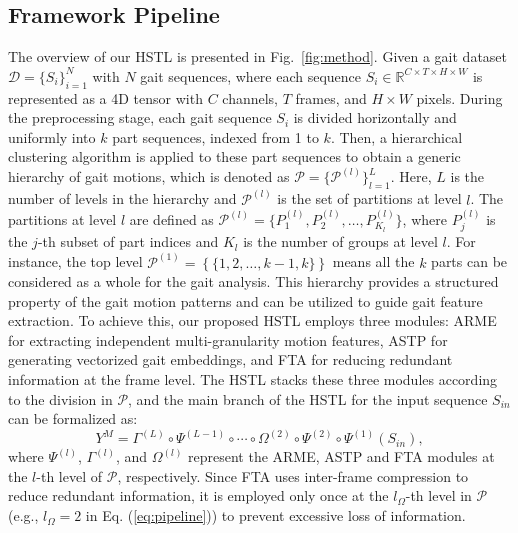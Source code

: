 \documentclass[10pt,twocolumn,letterpaper]{article}
\begin{document}
\subsection{Framework Pipeline}
\label{sec:pipe}
The overview of our HSTL is presented in Fig.~\ref{fig:method}. Given a gait dataset $\mathcal{D}=\{{S_i}\}_{i=1}^{N} $ with $N$ gait sequences, where each sequence $S_i \in \mathbb{R}^{C \times T \times H \times W}$ is represented as a 4D tensor with $C$ channels, $T$ frames, and $H \times W$ pixels. During  the preprocessing stage, each gait sequence $S_i$  is divided horizontally and uniformly into $k$ part sequences, indexed from 1 to $k$. Then, a hierarchical clustering algorithm \cite{ester1996density} is applied to these part sequences to obtain a generic hierarchy of gait motions, which is denoted as $\mathcal{P}=\{\mathcal{P}^{(l)}\}_{l=1}^{L}$. Here, $L$ is the number of levels in the hierarchy and $\mathcal{P}^{(l)}$ is the set of partitions at level $l$. The partitions at level $l$ are defined as
 $\mathcal{P}^{(l)}=\{P_1^{(l)}, P_2^{(l)}, \ldots, P_{K_{l}}^{(l)}\}$, where $P_j^{(l)}$ is the $j$-th subset of part indices and $K_l$ is the number of groups at level $l$. For instance, the top level $\mathcal{P}^{(1)}=\left\{\{1,2,\ldots, k-1,k\}\right\}$ means all the $k$ parts can be considered as a whole for the gait analysis. This hierarchy provides a structured  property of the gait motion patterns and can be utilized to guide gait feature extraction. To achieve this, our proposed HSTL employs three modules: ARME for extracting independent multi-granularity motion features, ASTP for generating vectorized gait embeddings, and FTA for reducing redundant information at the frame level. The HSTL stacks these three modules according to the division in $\mathcal{P}$, and the main branch of the HSTL for the input sequence $S_{in}$ can be formalized as:
\begin{equation}
\label{eq:pipeline}
    Y^{M}=\Gamma^{(L)} \circ \Psi^{(L-1)} \circ \cdots \circ \Omega^{(2)} \circ \Psi^{(2)} \circ \Psi^{(1)}(S_{in}),
\end{equation}
where $\Psi^{(l)}$, $\Gamma^{(l)}$, and $\Omega^{(l)}$ represent the ARME, ASTP and FTA modules at the $l$-th level of $\mathcal{P}$, respectively.  Since FTA uses inter-frame compression to reduce redundant information, it is employed only once at the $l_{\Omega}$-th level in $\mathcal{P}$ (e.g., $l_{\Omega}=2$ in Eq. (\ref{eq:pipeline})) to prevent excessive loss of information.
\end{document}
